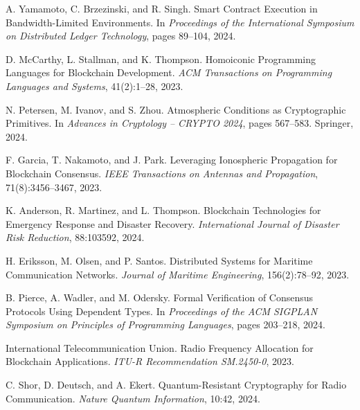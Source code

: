 \documentclass[11pt,a4paper]{article}
\begin{document}
\begin{thebibliography}{99}
A. Yamamoto, C. Brzezinski, and R. Singh.
\newblock Smart Contract Execution in Bandwidth-Limited Environments.
\newblock In \emph{Proceedings of the International Symposium on Distributed Ledger Technology}, pages 89--104, 2024.

D. McCarthy, L. Stallman, and K. Thompson.
\newblock Homoiconic Programming Languages for Blockchain Development.
\newblock \emph{ACM Transactions on Programming Languages and Systems}, 41(2):1--28, 2023.

N. Petersen, M. Ivanov, and S. Zhou.
\newblock Atmospheric Conditions as Cryptographic Primitives.
\newblock In \emph{Advances in Cryptology -- CRYPTO 2024}, pages 567--583. Springer, 2024.

F. Garcia, T. Nakamoto, and J. Park.
\newblock Leveraging Ionospheric Propagation for Blockchain Consensus.
\newblock \emph{IEEE Transactions on Antennas and Propagation}, 71(8):3456--3467, 2023.

K. Anderson, R. Martinez, and L. Thompson.
\newblock Blockchain Technologies for Emergency Response and Disaster Recovery.
\newblock \emph{International Journal of Disaster Risk Reduction}, 88:103592, 2024.

H. Eriksson, M. Olsen, and P. Santos.
\newblock Distributed Systems for Maritime Communication Networks.
\newblock \emph{Journal of Maritime Engineering}, 156(2):78--92, 2023.

B. Pierce, A. Wadler, and M. Odersky.
\newblock Formal Verification of Consensus Protocols Using Dependent Types.
\newblock In \emph{Proceedings of the ACM SIGPLAN Symposium on Principles of Programming Languages}, pages 203--218, 2024.

International Telecommunication Union.
\newblock Radio Frequency Allocation for Blockchain Applications.
\newblock \emph{ITU-R Recommendation SM.2450-0}, 2023.

C. Shor, D. Deutsch, and A. Ekert.
\newblock Quantum-Resistant Cryptography for Radio Communication.
\newblock \emph{Nature Quantum Information}, 10:42, 2024.

\end{thebibliography}
\end{document}
